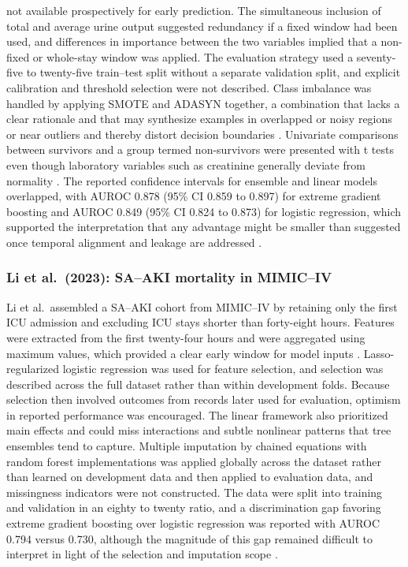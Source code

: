 not available prospectively for early prediction. The simultaneous inclusion of total and average urine output suggested redundancy if a fixed window had been used, and differences in importance between the two variables implied that a non-fixed or whole-stay window was applied. The evaluation strategy used a seventy-five to twenty-five train–test split without a separate validation split, and explicit calibration and threshold selection were not described. Class imbalance was handled by applying SMOTE and ADASYN together, a combination that lacks a clear rationale and that may synthesize examples in overlapped or noisy regions or near outliers and thereby distort decision boundaries \citep{Chawla_2002,He_2008,Blagus_2013,Saez_2015,Krawczyk_2016}. Univariate comparisons between survivors and a group termed non-survivors were presented with t tests even though laboratory variables such as creatinine generally deviate from normality \citep{Haeckel_2010}. The reported confidence intervals for ensemble and linear models overlapped, with AUROC 0.878 (95\% CI 0.859 to 0.897) for extreme gradient boosting and AUROC 0.849 (95\% CI 0.824 to 0.873) for logistic regression, which supported the interpretation that any advantage might be smaller than suggested once temporal alignment and leakage are addressed \citep{Chen_2025}.

\subsubsection{Li et al.\ (2023): SA--AKI mortality in MIMIC--IV}
Li et al.\ assembled a SA--AKI cohort from MIMIC--IV by retaining only the first ICU admission and excluding ICU stays shorter than forty-eight hours. Features were extracted from the first twenty-four hours and were aggregated using maximum values, which provided a clear early window for model inputs \citep{Li_2023_SciRep}. Lasso-regularized logistic regression was used for feature selection, and selection was described across the full dataset rather than within development folds. Because selection then involved outcomes from records later used for evaluation, optimism in reported performance was encouraged. The linear framework also prioritized main effects and could miss interactions and subtle nonlinear patterns that tree ensembles tend to capture. Multiple imputation by chained equations with random forest implementations was applied globally across the dataset rather than learned on development data and then applied to evaluation data, and missingness indicators were not constructed. The data were split into training and validation in an eighty to twenty ratio, and a discrimination gap favoring extreme gradient boosting over logistic regression was reported with AUROC 0.794 versus 0.730, although the magnitude of this gap remained difficult to interpret in light of the selection and imputation scope \citep{Li_2023_SciRep}.

